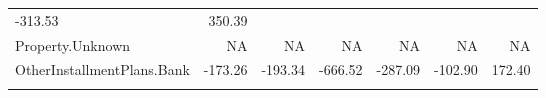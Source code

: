 \documentclass[]{article}
\begin{document}
\begin{longtable}[]{@{}lrrrrrr@{}}
\begin{minipage}[t]{0.08\columnwidth}
-313.53\strut
\end{minipage} & \begin{minipage}[t]{0.08\columnwidth}\raggedleft\strut
350.39\strut
\end{minipage}\tabularnewline
\begin{minipage}[t]{0.31\columnwidth}\raggedright\strut
Property.Unknown\strut
\end{minipage} & \begin{minipage}[t]{0.10\columnwidth}\raggedleft\strut
NA\strut
\end{minipage} & \begin{minipage}[t]{0.08\columnwidth}\raggedleft\strut
NA\strut
\end{minipage} & \begin{minipage}[t]{0.08\columnwidth}\raggedleft\strut
NA\strut
\end{minipage} & \begin{minipage}[t]{0.08\columnwidth}\raggedleft\strut
NA\strut
\end{minipage} & \begin{minipage}[t]{0.08\columnwidth}\raggedleft\strut
NA\strut
\end{minipage} & \begin{minipage}[t]{0.08\columnwidth}\raggedleft\strut
NA\strut
\end{minipage}\tabularnewline
\begin{minipage}[t]{0.31\columnwidth}\raggedright\strut
OtherInstallmentPlans.Bank\strut
\end{minipage} & \begin{minipage}[t]{0.10\columnwidth}\raggedleft\strut
-173.26\strut
\end{minipage} & \begin{minipage}[t]{0.08\columnwidth}\raggedleft\strut
-193.34\strut
\end{minipage} & \begin{minipage}[t]{0.08\columnwidth}\raggedleft\strut
-666.52\strut
\end{minipage} & \begin{minipage}[t]{0.08\columnwidth}\raggedleft\strut
-287.09\strut
\end{minipage} & \begin{minipage}[t]{0.08\columnwidth}\raggedleft\strut
-102.90\strut
\end{minipage} & \begin{minipage}[t]{0.08\columnwidth}\raggedleft\strut
172.40\strut
\end{minipage}\tabularnewline
\begin{minipage}[t]{0.31\columnwidth}\raggedright\strut

\end{minipage}
\end{longtable}
\end{document}
